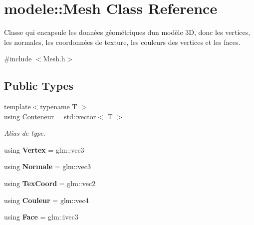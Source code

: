 \hypertarget{classmodele_1_1_mesh}{}\section{modele\+:\+:Mesh Class Reference}
\label{classmodele_1_1_mesh}


Classe qui encapsule les données géométriques d\textquotesingle{}un modèle 3\+D, donc les vertices, les normales, les coordonnées de texture, les couleurs des vertices et les faces.  




{\ttfamily \#include $<$Mesh.\+h$>$}

\subsection*{Public Types}
\begin{DoxyCompactItemize}
\item 
\hypertarget{classmodele_1_1_mesh_adbc8897d8cdca4541a2068c874aa54eb}{}{\footnotesize template$<$typename T $>$ }\\using \hyperlink{classmodele_1_1_mesh_adbc8897d8cdca4541a2068c874aa54eb}{Conteneur} = std\+::vector$<$ T $>$\label{classmodele_1_1_mesh_adbc8897d8cdca4541a2068c874aa54eb}

\begin{DoxyCompactList}\small\item\em Alias de type. \end{DoxyCompactList}\item 
\hypertarget{classmodele_1_1_mesh_afff0dcaf39cb8aac23e07704fd404b92}{}using {\bfseries Vertex} = glm\+::vec3\label{classmodele_1_1_mesh_afff0dcaf39cb8aac23e07704fd404b92}

\item 
\hypertarget{classmodele_1_1_mesh_a3d99d2b7a917cf9366fcda290afed7e8}{}using {\bfseries Normale} = glm\+::vec3\label{classmodele_1_1_mesh_a3d99d2b7a917cf9366fcda290afed7e8}

\item 
\hypertarget{classmodele_1_1_mesh_a92ca30b14afcb78679c812e44cdf176d}{}using {\bfseries Tex\+Coord} = glm\+::vec2\label{classmodele_1_1_mesh_a92ca30b14afcb78679c812e44cdf176d}

\item 
\hypertarget{classmodele_1_1_mesh_a41e1ae261228cf93233b09232d6be11d}{}using {\bfseries Couleur} = glm\+::vec4\label{classmodele_1_1_mesh_a41e1ae261228cf93233b09232d6be11d}

\item 
\hypertarget{classmodele_1_1_mesh_a6977203afc00e8f371f49c91f7fab183}{}using {\bfseries Face} = glm\+::ivec3\label{classmodele_1_1_mesh_a6977203afc00e8f371f49c91f7fab183}

\end{DoxyCompactItemize}
